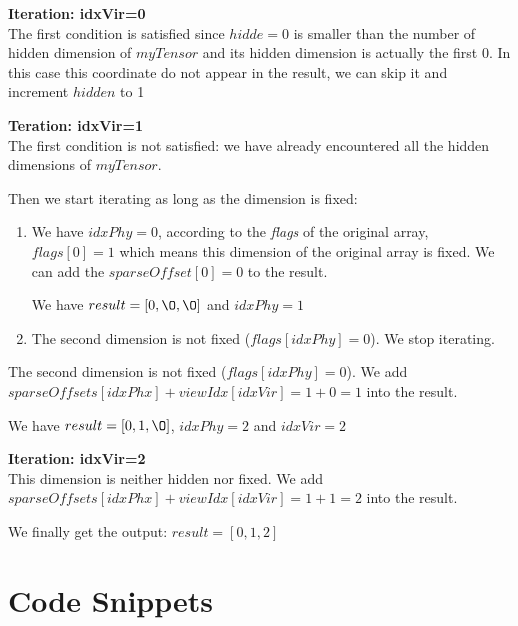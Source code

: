 	\textbf{Iteration: idxVir=0}\\
	The first condition is satisfied since $hidde=0$ is smaller than the number of hidden dimension of $myTensor$ and its hidden dimension is actually the first 0. In this case this coordinate do not appear in the result, we can skip it and increment $hidden$ to 1
	
	\textbf{Teration: idxVir=1}\\
	The first condition is not satisfied: we have already encountered all the hidden dimensions of $myTensor$.
	
	Then we start iterating as long as the dimension is fixed:
	\begin{enumerate}
		\item  We have $idxPhy=0$, according to the \textit{flags} of the original array, $flags[0] = 1$ which means this dimension of the original array is fixed. We can add the $sparseOffset[0] = 0$ to the result.
		
		We have $result = [0, \O, \O]$ and $idxPhy=1$
		
		\item The second dimension is not fixed ($flags[idxPhy] = 0$). We stop iterating.
	\end{enumerate}
	
	The second dimension is not fixed ($flags[idxPhy] = 0$).  We add $sparseOffsets[idxPhx] + viewIdx[idxVir] = 1 + 0 =  1$ into the result.
	
	We have $result = [0, 1, \O]$, $idxPhy=2$ and $idxVir=2$
	
	\textbf{Iteration: idxVir=2}\\
	This dimension is neither hidden nor fixed. We add $sparseOffsets[idxPhx] + viewIdx[idxVir] = 1 + 1 =  2$ into the result.
	
	We finally get the output: $result = [0, 1, 2]$
	
\section{Code Snippets}

\label{ch:codesnip}


